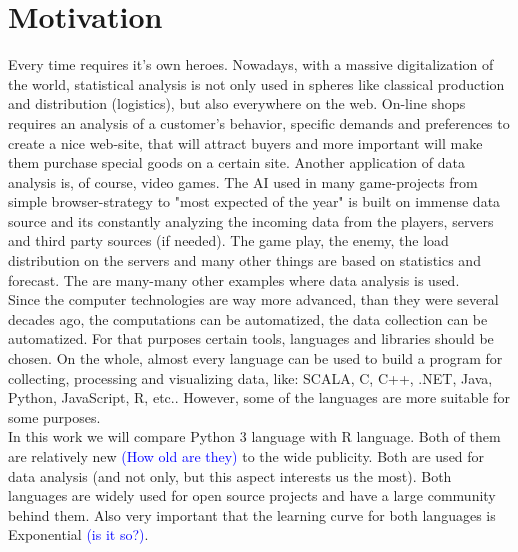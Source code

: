 \documentclass{article}
\begin{document}
\newpage
\section{Motivation}
Every time requires it's own heroes. Nowadays, with a massive digitalization of the world, statistical analysis is not only used in spheres like classical production and distribution (logistics), but also everywhere on the web. On-line shops requires an analysis of a customer's behavior, specific demands and preferences to create a nice web-site, that will attract buyers and more important will make them purchase special goods on a certain site. Another application of data analysis is, of course, video games. The AI used in many game-projects from simple browser-strategy to "most expected of the year" is built on immense data source and its constantly analyzing the incoming data from the players, servers and third party sources (if needed). The game play, the enemy, the load distribution on the servers and many other things are based on statistics and forecast. The are many-many other examples where data analysis is used.\vspace{3mm}\\
Since the computer technologies are way more advanced, than they were several decades ago, the computations can be automatized, the data collection can be automatized. For that purposes certain tools, languages and libraries should be chosen. On the whole, almost every language can be used to build a program for collecting, processing and visualizing data, like: SCALA, C, C++, .NET, Java, Python, JavaScript, R, etc.. However, some of the languages are more suitable for some purposes.\vspace{3mm}\\
In this work we will compare Python 3 language with R language. Both of them are relatively new \textcolor{blue}{(How old are they)} to the wide publicity. Both are used for data analysis (and not only, but this aspect interests us the most). Both languages are widely used for open source projects and have a large community behind them. Also very important that the learning curve for both languages is Exponential \textcolor{blue}{(is it so?)}.
 
\end{document}
